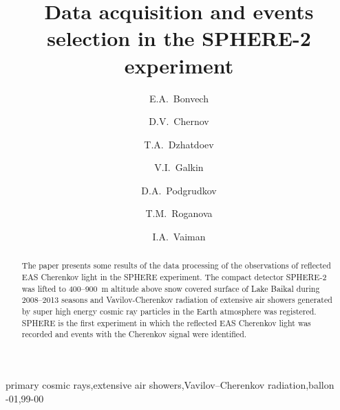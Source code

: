 \documentclass[final,5p,times,twocolumn]{elsarticle}
\begin{document}
\begin{frontmatter}
\title{Data acquisition and events selection in the SPHERE-2 experiment}
\author[address1]{E.A.~Bonvech}
\author[address1]{D.V.~Chernov}
\author[address1]{T.A.~Dzhatdoev}
\author[address2]{V.I.~Galkin}
\author[address2,address1]{D.A.~Podgrudkov}
\author[address1]{T.M.~Roganova}
\author[address2]{I.A.~Vaiman}
\address[address1]{Federal State Budget Educational Institution of Higher Education, M.V. Lomonosov Moscow State University, Skobeltsyn Institute of Nuclear Physics (SINP MSU), 1(2), Leninskie gory, GSP-1, 119991 Moscow, Russia}
\address[address2]{Federal State Budget Educational Institution of Higher Education, M.V. Lomonosov Moscow State University, Department of Physics, 1(2), Leninskie gory, GSP-1, 119991 Moscow, Russia}

\begin{abstract}
The paper presents some results of the data processing of the observations of reflected EAS Cherenkov light in the SPHERE experiment. The compact detector SPHERE-2 was lifted to 400--900~m altitude above snow covered surface of Lake Baikal during 2008--2013 seasons and Vavilov-Cherenkov radiation of extensive air showers generated by super high energy cosmic ray particles in the Earth atmosphere was registered. SPHERE is the first experiment in which the reflected EAS Cherenkov light was recorded and events with the Cherenkov signal were identified.
\end{abstract}
\begin{keyword}
primary cosmic rays\sep extensive air showers\sep Vavilov--Cherenkov radiation\sep ballon
-01\sep  99-00
\end{keyword}
\end{frontmatter}
\linenumbers

\end{document}
